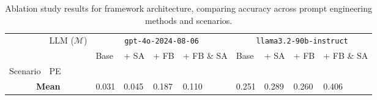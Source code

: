 \begin{table*}[!t]
\caption{Ablation study results for framework architecture, comparing accuracy across prompt engineering methods and scenarios.}
\label{tab:ablation_study}
\begin{tabular}{p{1.5cm}p{1.5cm}|p{1.3cm}p{1.3cm}p{1.3cm}p{1.3cm}|p{1.3cm}p{1.3cm}p{1.3cm}p{1.3cm}}
\toprule
 & LLM ($\mathcal{M}$) & \multicolumn{4}{c|}{\texttt{gpt-4o-2024-08-06}} & \multicolumn{4}{c}{\texttt{llama3.2-90b-instruct}} \\
 &  & Base & + SA & + FB & + FB \& SA & Base & + SA & + FB & + FB \& SA \\
Scenario & PE &  &  &  &  &  &  &  &  \\
\midrule
\multicolumn{2}{c|}{\textbf{Mean}} & 0.031 & 0.045 & 0.187 & 0.110 & 0.251 & 0.289 & 0.260 & 0.406 \\
\bottomrule
\end{tabular}
\midrule
\end{table*}
\midrule